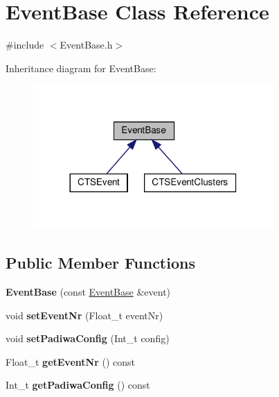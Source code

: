 \hypertarget{classEventBase}{}\section{Event\+Base Class Reference}
\label{classEventBase}


{\ttfamily \#include $<$Event\+Base.\+h$>$}



Inheritance diagram for Event\+Base\+:\nopagebreak
\begin{figure}[H]
\begin{center}
\leavevmode
\includegraphics[width=260pt]{classEventBase__inherit__graph}
\end{center}
\end{figure}
\subsection*{Public Member Functions}
\begin{DoxyCompactItemize}
\item 
\mbox{\label{classEventBase_a7451d4e0fe0969ccb386580c532ae840}} 
{\bfseries Event\+Base} (const \hyperlink{classEventBase}{Event\+Base} \&event)
\item 
\mbox{\label{classEventBase_a8a10415e840424b7f8c8e40ecea2b391}} 
void {\bfseries set\+Event\+Nr} (Float\+\_\+t event\+Nr)
\item 
\mbox{\label{classEventBase_ac94ea2e36812d76b63e2ad0798fb85cc}} 
void {\bfseries set\+Padiwa\+Config} (Int\+\_\+t config)
\item 
\mbox{\label{classEventBase_ae00e0bf9992a8c62d6f236bb01f7a785}} 
Float\+\_\+t {\bfseries get\+Event\+Nr} () const
\item 
\mbox{\label{classEventBase_ae31520fb8359882ec91aeb7825f3e6e0}} 
Int\+\_\+t {\bfseries get\+Padiwa\+Config} () const
\end{DoxyCompactItemize}


